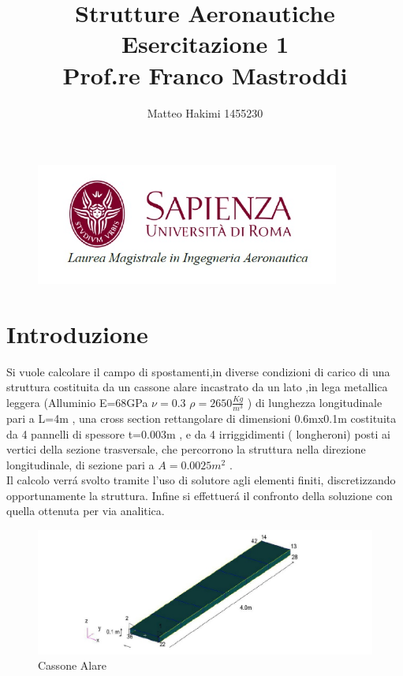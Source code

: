\documentclass[12pt,a4paper]{article}
\date{}
\begin{document}
\title{Strutture Aeronautiche\\ Esercitazione 1 \\ Prof.re Franco Mastroddi}
\author{Matteo Hakimi 1455230}
\maketitle
\begin{figure}[htbp]
\centering
\includegraphics[width=100mm]{Immagini/sapienzalogo}
\end{figure}
\newpage
\tableofcontents
\newpage

\section{Introduzione}
Si vuole calcolare il campo di spostamenti,in diverse condizioni di carico di una struttura costituita da un cassone alare incastrato da un lato ,in lega metallica
leggera (Alluminio E=68GPa  $\nu =0.3$  $\rho=2650\frac{Kg}{m^3}$ ) di lunghezza longitudinale pari a L=4m , una cross section rettangolare di dimensioni 0.6mx0.1m
costituita da 4 pannelli di spessore t=0.003m , e da 4 irriggidimenti ( longheroni) posti ai vertici della sezione trasversale, che percorrono la struttura nella direzione longitudinale, di sezione pari a $ A=0.0025{m^2} $  .\\
Il calcolo verr\'a svolto tramite l'uso di solutore agli elementi finiti, discretizzando opportunamente la struttura.
Infine si effettuer\'a il confronto della soluzione con quella ottenuta per via analitica.
 
\begin{figure}[htbp]
\centering
\includegraphics[width=150mm]{Immagini/Cassone}
\caption{Cassone Alare}
\end{figure}
\end{document}
